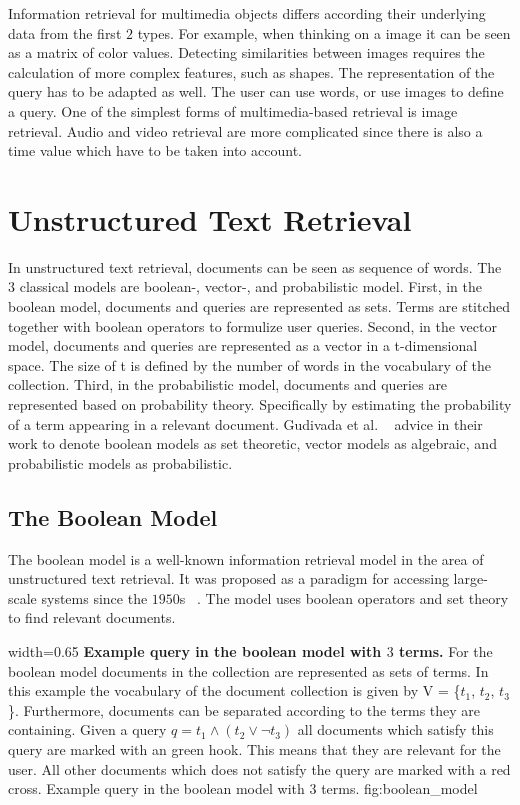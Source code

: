 Information retrieval for multimedia objects differs according their underlying data from the first $2$ types. For example, when thinking on a image it can be seen as a matrix of color values. Detecting similarities between images requires the calculation of more complex features, such as shapes. The representation of the query has to be adapted as well. The user can use words, or use images to define a query. One of the simplest forms of multimedia-based retrieval is image retrieval. Audio and video retrieval are more complicated since there is also a time value which have to be taken into account.

\section{Unstructured Text Retrieval}
\label{sec:unstructured_text_Retrieval}

In unstructured text retrieval, documents can be seen as sequence of words. The $3$ classical models are boolean-, vector-, and probabilistic model. First, in the boolean model, documents and queries are represented as sets. Terms are stitched together with boolean operators to formulize user queries. Second, in the vector model, documents and queries are represented as a vector in a t-dimensional space. The size of t is defined by the number of words in the vocabulary of the collection. Third, in the probabilistic model, documents and queries are represented based on probability theory. Specifically by estimating the probability of a term appearing in a relevant document. Gudivada et al. ~\cite{gudivada1997} advice in their work to denote boolean models as set theoretic, vector models as algebraic, and probabilistic models as probabilistic.

\subsection{The Boolean Model}
\label{sec:the_boolean_model}

The boolean model is a well-known information retrieval model in the area of unstructured text retrieval. It was proposed as a paradigm for accessing large-scale systems since the $1950$s ~\cite{Melucci2009}. The model uses boolean operators and set theory to find relevant documents.

      {width=0.65\textwidth}
      {\textbf{Example query in the boolean model with $3$ terms.} For the boolean model documents in the collection are represented as sets of terms. In this example the vocabulary of the document collection is given by V = \{$t_1$, $t_2$, $t_3$\}. Furthermore, documents can be separated according to the terms they are containing. Given a query $q=t_1 \wedge (t_2 \vee \neg t_3)$ all documents which satisfy this query are marked with an green hook. This means that they are relevant for the user. All other documents which does not satisfy the query are marked with a red cross.}
      {Example query in the boolean model with $3$ terms.}
      {fig:boolean_model}

